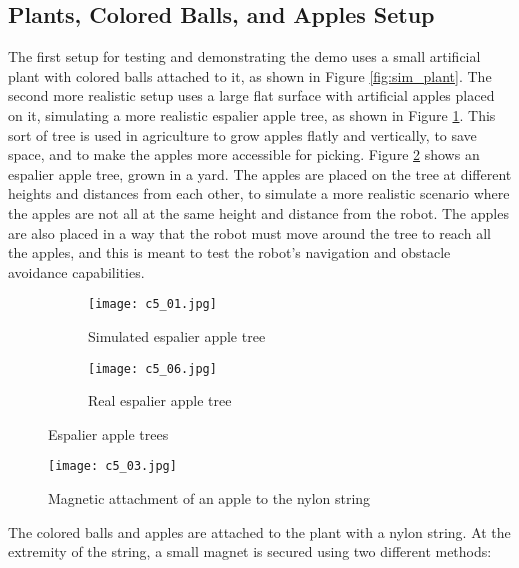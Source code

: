 \subsection{Plants, Colored Balls, and Apples Setup}

The first setup for testing and demonstrating the demo uses a small artificial plant with colored balls attached to it,
as shown in Figure \ref{fig:sim_plant}.
The second more realistic setup uses a large flat surface with artificial apples placed on it, simulating a more realistic
espalier apple tree, as shown in Figure \ref{fig:sim_espalier}.
This sort of tree is used in agriculture to grow apples flatly and vertically, to save space,
and to make the apples more accessible for picking. Figure \ref{fig:real_espalier} shows an espalier apple tree,
grown in a yard.
The apples are placed on the tree at different heights and distances
from each other, to simulate a more realistic scenario where the apples are not all at the same height and distance
from the robot. The apples are also placed in a way that the robot must move around the tree to reach all the apples,
and this is meant to test the robot's navigation and obstacle avoidance capabilities.

\begin{figure}[t]
    \centering
    \begin{subfigure}{0.45\textwidth}
        \texttt{[image: c5\_01.jpg]}
        \caption{Simulated espalier apple tree}
        \label{fig:sim_espalier}
    \end{subfigure}
    \hfill %
    \begin{subfigure}{0.5\textwidth}
        \texttt{[image: c5\_06.jpg]}
        \caption{Real espalier apple tree}
        \label{fig:real_espalier}
    \end{subfigure}
    \caption{Espalier apple trees}
    \label{fig:plants}
\end{figure}

\begin{figure}[t]
    \centering
    \texttt{[image: c5\_03.jpg]}
    \caption{Magnetic attachment of an apple to the nylon string}
    \label{fig:magnetic}
\end{figure}

The colored balls and apples are attached to the plant with a nylon string. At the extremity of the string, 
a small magnet is secured using two different methods:

